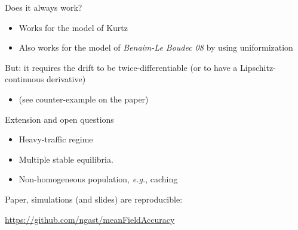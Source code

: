 \documentclass{beamer}
\newcommand\red[1]{{\color{red}#1}}
\begin{document}
\begin{frame}{Does it always work?}
  \begin{itemize}
  \item Works for the model of Kurtz
  \item Also works for the model of \emph{Benaim-Le Boudec 08} by
    using uniformization 
  \end{itemize}

  \bigskip
  But: it requires the drift to be \red{twice-differentiable} (or to
  have a Lipschitz-continuous derivative)
  \begin{itemize}
  \item (see counter-example on the paper)
  \end{itemize}
\end{frame}


\begin{frame}{Extension and open questions}
  \begin{itemize}
  \item Heavy-traffic regime 
  \item Multiple stable equilibria. 
  \item Non-homogeneous population, \emph{e.g.}, caching
  \end{itemize}
  
  \bigskip\bigskip
  
  Paper, simulations (and slides) are \red{reproducible}:
  \begin{center}
    \url{https://github.com/ngast/meanFieldAccuracy}
  \end{center}
\end{frame}

\appendix
\end{document}
